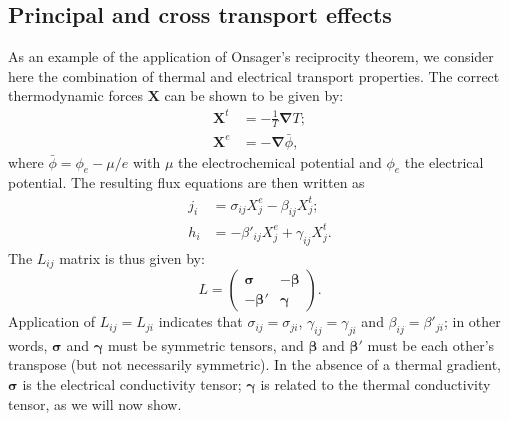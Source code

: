 \subsection{Principal and cross transport effects}\label{\chabbr:ssec:Lprincipaleffects}

As an example of the application of Onsager's reciprocity theorem, we consider here the combination of thermal and electrical transport properties. The correct thermodynamic forces $\bm{X}$ can be shown to be given by:
\begin{align}
	\bm{X}^t &= -\frac{1}{T}\bm{\nabla}T;\\
	\bm{X}^e &= -\bm{\nabla}\bar{\phi},
\end{align}
where $\bar{\phi} = \phi_e - \mu/e$ with $\mu$ the electrochemical potential and $\phi_e$ the electrical potential. The resulting flux equations are then written as
\begin{align}
	j_i &= \sigma_{ij} X^e_j - \beta_{ij} X^t_j;\\
	h_i &= -\beta'_{ij}X^e_j +\gamma_{ij} X^t_j.
\end{align}
The $L_{ij}$ matrix is thus given by:
\begin{equation}
	L = \left(\begin{array}{cc} \bm{\sigma} & -\bm{\beta}\\ 
	-\bm{\beta}' & \bm{\gamma}\end{array}\right).
\end{equation}
Application of $L_{ij}=L_{ji}$ indicates that $\sigma_{ij}=\sigma_{ji}$, $\gamma_{ij}=\gamma_{ji}$ and $\beta_{ij} = \beta'_{ji}$; in other words, $\bm{\sigma}$ and $\bm{\gamma}$ must be symmetric tensors, and $\bm{\beta}$ and $\bm{\beta}'$ must be each other's transpose (but not necessarily symmetric).  In the absence of a thermal gradient, $\bm{\sigma}$ is the electrical conductivity tensor;  $\bm{\gamma}$ is related to the thermal conductivity tensor, as we will now show.

